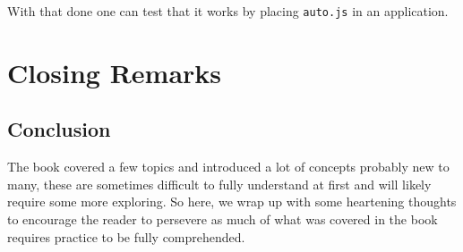 \documentclass[
]{krantz}
\makeatletter
\newenvironment{Shaded}{\begin{snugshade}}{\end{snugshade}}
\newcommand{\ControlFlowTok}[1]{\textcolor[rgb]{0.27,0.27,0.27}{\textbf{#1}}}
\newcommand{\DataTypeTok}[1]{\textcolor[rgb]{0.27,0.27,0.27}{#1}}
\newcommand{\DecValTok}[1]{\textcolor[rgb]{0.06,0.06,0.06}{#1}}
\newcommand{\KeywordTok}[1]{\textcolor[rgb]{0.27,0.27,0.27}{\textbf{#1}}}
\newcommand{\NormalTok}[1]{#1}
\newcommand{\OperatorTok}[1]{\textcolor[rgb]{0.43,0.43,0.43}{\textbf{#1}}}
\newcommand{\StringTok}[1]{\textcolor[rgb]{0.5,0.5,0.5}{#1}}
\newenvironment{kframe}{%
\medskip{}
\setlength{\fboxsep}{.8em}
 \def\at@end@of@kframe{}%
 \ifinner\ifhmode%
  \def\at@end@of@kframe{\end{minipage}}%
  \begin{minipage}{\columnwidth}%
 \fi\fi%
 \def\FrameCommand##1{\hskip\@totalleftmargin \hskip-\fboxsep
 \colorbox{shadecolor}{##1}\hskip-\fboxsep
     \hskip-\linewidth \hskip-\@totalleftmargin \hskip\columnwidth}%
 \MakeFramed {\advance\hsize-\width
   \@totalleftmargin\z@ \linewidth\hsize
   \@setminipage}}%
 {\par\unskip\endMakeFramed%
 \at@end@of@kframe}
\renewenvironment{Shaded}{\begin{kframe}}{\end{kframe}}
\makeatother
\begin{document}
With that done one can test that it works by placing \texttt{auto.js} in an application.

\begin{Shaded}
\end{Shaded}

\hypertarget{part-closing-remarks}{%
\part{Closing Remarks}\label{part-closing-remarks}}

\hypertarget{conclusion}{%
\chapter{Conclusion}\label{conclusion}}

The book covered a few topics and introduced a lot of concepts probably new to many, these are sometimes difficult to fully understand at first and will likely require some more exploring. So here, we wrap up with some heartening thoughts to encourage the reader to persevere as much of what was covered in the book requires practice to be fully comprehended.
\end{document}
